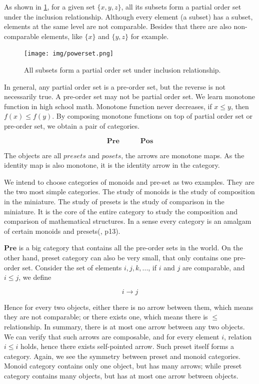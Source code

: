 \documentclass[b5paper]{article}
\begin{document}
As shown in \ref{fig:powerset}, for a given set $\{x, y, z\}$, all its subsets form a partial order set under the inclusion relationship. Although every element (a subset) has a subset, elements at the same level are not comparable. Besides that there are also non-comparable elements, like $\{x\}$ and $\{y, z\}$ for example.

\begin{figure}[htbp]
 \centering
 \texttt{[image: img/powerset.png]}
 \caption{All subsets form a partial order set under inclusion relationship.}
 \label{fig:powerset}
\end{figure}

 
In general, any partial order set is a pre-order set, but the reverse is not necessarily true. A pre-order set may not be partial order set. We learn monotone function in high school math. Monotone function never decreases, if $x \leq y$, then $f(x) \leq f(y)$. By composing monotone functions on top of partial order set or pre-order set, we obtain a pair of categories.

\[
\pmb{Pre} \quad \quad \quad \pmb{Pos}
\]

The objects are all $presets$ and $posets$, the arrows are monotone maps. As the identity map is also monotone, it is the identity arrow in the category.

We intend to choose categories of monoids and pre-set as two examples. They are the two most simple categories. The study of monoids is the study of composition in the miniature. The study of presets is the study of comparison in the miniature. It is the core of the entire category to study the composition and comparison of mathematical structures. In a sense every category is an amalgam of certain monoids and presets(\cite{Simmons2011}, p13).

$\pmb{Pre}$ is a big category that contains all the pre-order sets in the world. On the other hand, preset category can also be very small, that only contains one pre-order set. Consider the set of elements $i, j, k, ...$, if $i$ and $j$ are comparable, and $i \leq j$, we define

\[
i \longrightarrow j
\]

Hence for every two objects, either there is no arrow between them, which means they are not comparable; or there exists one, which means there is $\leq$ relationship. In summary, there is at most one arrow between any two objects. We can verify that such arrows are composable, and for every element $i$, relation $i \leq i$ holds, hence there exists self-pointed arrow. Such preset itself forms a category. Again, we see the symmetry between preset and monoid categories. Monoid category contains only one object, but has many arrows; while preset category contains many objects, but has at most one arrow between objects.
\end{document}
